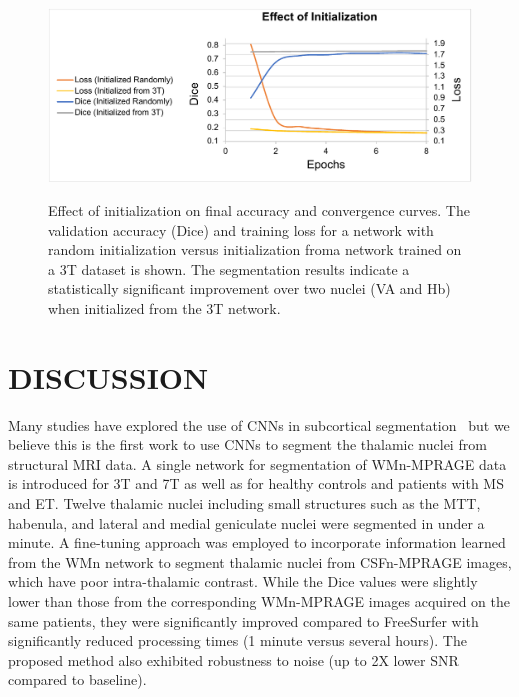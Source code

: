 \begin{figure}[!htbp]
\centering\includegraphics[width=\textwidth]{figures/pdf/SupportingFigure1.pdf}\label{Thalamus.Fig.5.ConvergenceRate}
\caption{Effect of initialization on final accuracy and convergence curves. The validation accuracy (Dice) and training loss for a network with random initialization versus initialization froma network trained on a 3T dataset is shown. The segmentation results indicate a statistically significant improvement over two nuclei (VA and Hb) when initialized from the 3T network.}
\end{figure}


\section{DISCUSSION}

Many studies have explored the use of CNNs in subcortical segmentation~\cite{1921968:2796435} \cite{moeskops_Automatic_2016,milletari_HoughCNN_2017, shakeri_Subcortical_2016} but we believe this is the first work to use CNNs to segment the thalamic nuclei from structural MRI data. A single network for segmentation of WMn-MPRAGE data is introduced for 3T and 7T as well as for healthy controls and patients with MS and ET\@. Twelve thalamic nuclei including small structures such as the MTT, habenula, and lateral and medial geniculate nuclei were segmented in under a minute. A fine-tuning approach was employed to incorporate information learned from the WMn network to segment thalamic nuclei from CSFn-MPRAGE images, which have poor intra-thalamic contrast. While the Dice values were slightly lower than those from the corresponding WMn-MPRAGE images acquired on the same patients, they were significantly improved compared to FreeSurfer with significantly reduced processing times (1 minute versus several hours). The proposed method also exhibited robustness to noise (up to 2X lower SNR compared to baseline).

